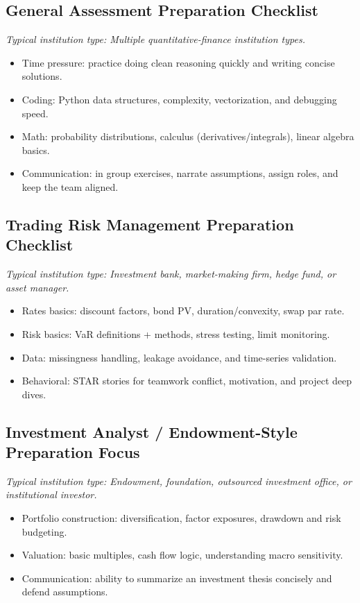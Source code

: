 \documentclass[11pt,letterpaper,openany]{book}
\newcommand{\RoleProfile}[2]{%
  \subsection{#1}%
  \noindent\textit{Typical institution type: #2.}\par
}
\begin{document}
\RoleProfile{General Assessment Preparation Checklist}{Multiple quantitative-finance institution types}
\begin{itemize}
  \item Time pressure: practice doing clean reasoning quickly and writing concise solutions.
  \item Coding: Python data structures, complexity, vectorization, and debugging speed.
  \item Math: probability distributions, calculus (derivatives/integrals), linear algebra basics.
  \item Communication: in group exercises, narrate assumptions, assign roles, and keep the team aligned.
\end{itemize}

\RoleProfile{Trading Risk Management Preparation Checklist}{Investment bank, market-making firm, hedge fund, or asset manager}
\begin{itemize}
  \item Rates basics: discount factors, bond PV, duration/convexity, swap par rate.
  \item Risk basics: VaR definitions + methods, stress testing, limit monitoring.
  \item Data: missingness handling, leakage avoidance, and time-series validation.
  \item Behavioral: STAR stories for teamwork conflict, motivation, and project deep dives.
\end{itemize}

\RoleProfile{Investment Analyst / Endowment-Style Preparation Focus}{Endowment, foundation, outsourced investment office, or institutional investor}
\begin{itemize}
  \item Portfolio construction: diversification, factor exposures, drawdown and risk budgeting.
  \item Valuation: basic multiples, cash flow logic, understanding macro sensitivity.
  \item Communication: ability to summarize an investment thesis concisely and defend assumptions.
\end{itemize}


\newpage
\end{document}
